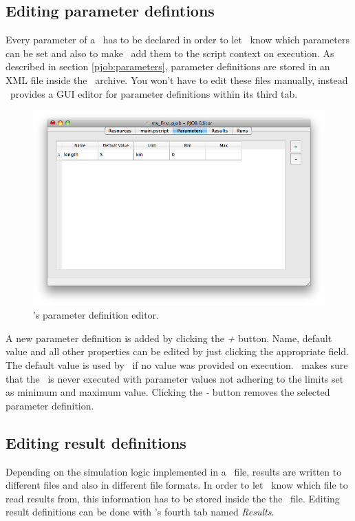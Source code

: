 \subsection{Editing parameter defintions}
Every parameter of a \PJOB\ has to be declared in order to let \PQUEUE\ know which parameters can be set
and also to make \PHO\ add them to the script context on execution.
As described in section \ref{pjob:parameters},
parameter definitions are stored in an XML file inside the \PJOB\ archive.
You won't have to edit these files manually,
instead \pjobeditor\ provides a GUI editor for parameter definitions within its third tab.
\begin{figure}[h!]
\includegraphics[width=\textwidth]{Screenshots/PJobEditor/parameter.png}
\caption{\pjobeditor's parameter definition editor.}
\label{editor:parameter}
\end{figure}
A new parameter definition is added by clicking the \textit{+} button.
Name, default value and all other properties can be edited by just clicking the appropriate field.
The default value is used by \PHO\ if no value was provided on execution.
\PHO\ makes sure that the \PJOB\ is never executed with parameter values not adhering to the limits set as minimum and maximum value.
Clicking the \textit{-} button removes the selected parameter definition.




\subsection{Editing result definitions}
Depending on the simulation logic implemented in a \PJOB\ file,
results are written to different files and also in different file formats.
In order to let \PQUEUE\ know which file to read results from,
this information has to be stored inside the the \PJOB\ file.
Editing result definitions can be done with \pjobeditor's fourth tab named \textit{Results}.\bb

